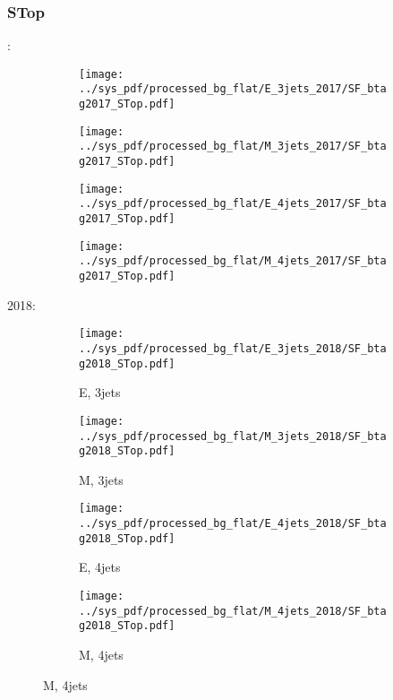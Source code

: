 \documentclass{beamer}
\begin{document}
\begin{frame}
\frametitle{STop}
\fontsize{5}{1}:
\begin{figure}
\centering
\begin{subfigure}[b]{0.24\textwidth}
\texttt{[image: ../sys\_pdf/processed\_bg\_flat/E\_3jets\_2017/SF\_btag2017\_STop.pdf]}
\end{subfigure}
\begin{subfigure}[b]{0.24\textwidth}
\texttt{[image: ../sys\_pdf/processed\_bg\_flat/M\_3jets\_2017/SF\_btag2017\_STop.pdf]}
\end{subfigure}
\begin{subfigure}[b]{0.24\textwidth}
\texttt{[image: ../sys\_pdf/processed\_bg\_flat/E\_4jets\_2017/SF\_btag2017\_STop.pdf]}
\end{subfigure}
\begin{subfigure}[b]{0.24\textwidth}
\texttt{[image: ../sys\_pdf/processed\_bg\_flat/M\_4jets\_2017/SF\_btag2017\_STop.pdf]}
\end{subfigure}
\end{figure}
2018:
\begin{figure}
\centering
\begin{subfigure}[b]{0.24\textwidth}
\texttt{[image: ../sys\_pdf/processed\_bg\_flat/E\_3jets\_2018/SF\_btag2018\_STop.pdf]}
\captionsetup{font=tiny}
\caption{E, 3jets}
\end{subfigure}
\begin{subfigure}[b]{0.24\textwidth}
\texttt{[image: ../sys\_pdf/processed\_bg\_flat/M\_3jets\_2018/SF\_btag2018\_STop.pdf]}
\captionsetup{font=tiny}
\caption{M, 3jets}
\end{subfigure}
\begin{subfigure}[b]{0.24\textwidth}
\texttt{[image: ../sys\_pdf/processed\_bg\_flat/E\_4jets\_2018/SF\_btag2018\_STop.pdf]}
\captionsetup{font=tiny}
\caption{E, 4jets}
\end{subfigure}
\begin{subfigure}[b]{0.24\textwidth}
\texttt{[image: ../sys\_pdf/processed\_bg\_flat/M\_4jets\_2018/SF\_btag2018\_STop.pdf]}
\captionsetup{font=tiny}
\caption{M, 4jets}
\end{subfigure}
\end{figure}
\end{frame}
\end{document}
